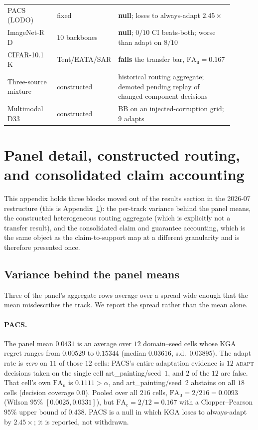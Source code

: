 \begin{table}[t]
\begin{tabular}{@{}p{0.22\linewidth}p{0.16\linewidth}p{0.52\linewidth}@{}}
PACS (LODO) & fixed & \textbf{null}; loses to always-adapt $2.45\times$ \\
ImageNet-R D & $10$ backbones & \textbf{null}; $0/10$ CI beats-both; worse than adapt on $8/10$ \\
CIFAR-10.1 K & Tent/EATA/SAR & \textbf{fails} the transfer bar, $\mathrm{FA}_{\mathrm u}=0.167$ \\
Three-source mixture & constructed & historical routing aggregate; demoted pending replay of changed component decisions \\
Multimodal D33 & constructed & BB on an injected-corruption grid; $9$ adapts \\
\bottomrule
\end{tabular}
\end{table}

\section{Panel detail, constructed routing, and consolidated claim
accounting}\label{app:panel-detail}
This appendix holds three blocks moved out of the results section in the 2026-07
restructure (this is Appendix~\ref{app:panel-detail}): the per-track variance behind the panel means, the constructed heterogeneous
routing aggregate (which is explicitly not a transfer result), and the consolidated claim and
guarantee accounting, which is the same object as the claim-to-support map at a different
granularity and is therefore presented once.

\subsection{Variance behind the panel means}\label{sec:panel-variance}
Three of the panel's aggregate rows average over a spread wide enough that the mean misdescribes the
track. We report the spread rather than the mean alone.

\paragraph{PACS.} The panel mean $0.0431$ is an average over $12$ domain--seed cells whose \textsc{KGA}
regret ranges from $0.00529$ to $0.15344$ (median $0.03616$, s.d.\ $0.03895$). The adapt rate is
\emph{zero} on $11$ of those $12$ cells: PACS's entire adaptation evidence is $12$ \textsc{adapt}
decisions taken on the single cell art\_painting/seed~$1$, and $2$ of the $12$ are false. That cell's
own $\mathrm{FA}_{\mathrm u}$ is $0.1111>\alpha$, and art\_painting/seed~$2$ abstains on all $18$
cells (decision coverage $0.0$). Pooled over all $216$ cells, $\mathrm{FA}_{\mathrm u}=2/216=0.0093$
(Wilson $95\%$ $[0.0025,0.0331]$), but $\mathrm{FA}_{\mathrm c}=2/12=0.167$ with a Clopper--Pearson
$95\%$ upper bound of $0.438$. PACS is a null in which \textsc{KGA} loses to always-adapt by
$2.45\times$; it is reported, not withdrawn.

